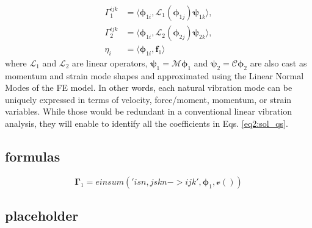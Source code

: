 \documentclass[11pt]{article}
\newcommand{\lo}{\mathcal{L}}
\begin{document}
\begin{align}\label{eq2:gammas12}
\Gamma_{1}^{ijk} & = \langle \pmb{\phi}_{1i}, \lo_1(\pmb{\phi}_{1j})\pmb{\psi}_{1k}\rangle, \nonumber \\
\Gamma_{2}^{ijk} & = \langle \pmb{\phi}_{1i}, \lo_2(\pmb{\phi}_{2j})\pmb{\psi}_{2k}\rangle,  \\
\eta_{i} & = \langle \pmb{\phi}_{1i}, \pmb{f}_1\rangle  \nonumber
\end{align}
where \(\lo_1\) and \(\lo_2\) are linear operators, \(\pmb{\psi}_1 = \bm{\mathcal{M}}\pmb{\phi}_1\) and \(\pmb{\psi}_2 = \bm{\mathcal{C}}\pmb{\phi}_2\) are also cast as momentum and strain mode shapes and approximated using the Linear Normal Modes of the FE model. In other words, each natural vibration mode can be uniquely expressed in terms of velocity, force/moment, momentum, or strain variables. While those would be redundant in a conventional linear vibration analysis, they will enable to identify all the coefficients in Eqs. \eqref{eq2:sol_qs}.
\subsection{formulas}
\label{sec:orgc6aff4b}
$$
\bm \Gamma_1 = einsum('isn,jskn->ijk', \bm \phi_1, \mathcal{v}())
$$

\subsection{placeholder}
\label{sec:org6871729}
\end{document}
